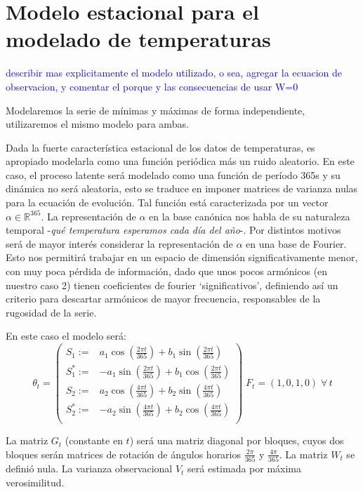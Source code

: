 \documentclass[12pt]{article}\usepackage[]{graphicx}\usepackage[]{color}
\newcommand{\RR}{\mathbb{R}}
\begin{document}
\section{Modelo estacional para el modelado de temperaturas}\label{DLMtemp}
\textcolor{blue}{describir mas explicitamente el modelo utilizado, o sea, agregar la ecuacion de observacion, y comentar el porque y las consecuencias de usar W=0}

Modelaremos la serie de mínimas y máximas de forma independiente, utilizaremos el mismo modelo para ambas.

Dada la fuerte característica estacional de los datos de temperaturas, es apropiado modelarla como una función periódica más un ruido aleatorio. En este caso, el proceso latente será modelado como una función de período 365s y su dinámica no será aleatoria, esto se traduce en imponer matrices de varianza nulas para la ecuación de evolución.
Tal función está caracterizada por un vector $\alpha \in \RR^{365}$. La representación de $\alpha$ en la base canónica nos habla de su naturaleza temporal -\textit{qué temperatura esperamos cada día del año}-. Por distintos motivos será de mayor interés considerar la representación de $\alpha$ en una base de Fourier. Esto nos permitirá trabajar en un espacio de dimensión significativamente menor, con muy poca pérdida de información, dado que unos pocos armónicos (en nuestro caso 2) tienen coeficientes de fourier `significativos', definiendo así un criterio para descartar armónicos de mayor frecuencia, responsables de la rugosidad de la serie.

En este caso el modelo será:
$$\theta_t=\left(\begin{array}{lr}
S_1:=& a_1\cos\left(\frac{2\pi t}{365}\right) + b_1 \sin\left(\frac{2\pi t}{365}\right) \\
S_1^*:=& -a_1\sin\left(\frac{2\pi t}{365}\right) + b_1 \cos\left(\frac{2\pi t}{365}\right) \\
S_2:= &a_2\cos\left(\frac{4\pi t}{365}\right) + b_2 \sin\left(\frac{4\pi t}{365}\right) \\
S_2^*:=& -a_2\sin\left(\frac{4\pi t}{365}\right) + b_2 \cos\left(\frac{4\pi t}{365}\right) \\
\end{array}\right)\; F_t=(1,0,1,0) \; \forall \, t$$

La matriz $G_t$ (constante en $t$) será una matriz diagonal por bloques, cuyos dos bloques serán matrices de rotación de ángulos horarios $\frac{2\pi}{365}$ y $\frac{4\pi}{365}$. La matriz $W_t$ se definió nula. La varianza observacional $V_t$ será estimada por máxima verosimilitud.
\end{document}
